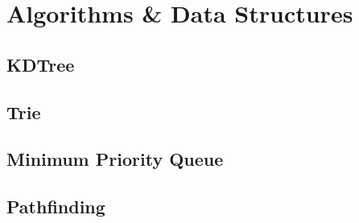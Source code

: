 \section{Algorithms \& Data Structures}
\subsection{KDTree}
\subsection{Trie}
\subsection{Minimum Priority Queue}
\subsection{Pathfinding}
